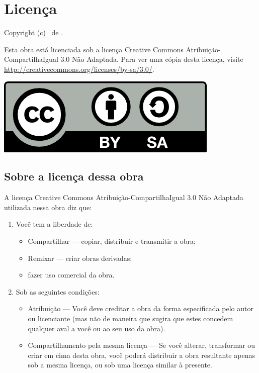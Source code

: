 \chapter{Licença}
Copyright (c) \ano \ de \autor.

Esta obra está licenciada sob a licença Creative Commons
Atribuição-CompartilhaIgual 3.0 Não Adaptada. Para ver uma cópia desta licença,
visite \url{http://creativecommons.org/licenses/by-sa/3.0/}.

\begin{center}
  \includegraphics{figuras/cc-by-sa.png}
\end{center}

\section{Sobre a licença dessa obra}
A licença Creative Commons Atribuição-CompartilhaIgual 3.0 Não Adaptada
utilizada nessa obra diz que:
\begin{enumerate}
  \item Você tem a liberdade de:
    \begin{itemize}
      \item Compartilhar — copiar, distribuir e transmitir a obra;
      \item Remixar — criar obras derivadas;
      \item fazer uso comercial da obra.
    \end{itemize}
  \item Sob as seguintes condições:
    \begin{itemize}
      \item Atribuição — Você deve creditar a obra da forma especificada pelo
        autor ou licenciante (mas não de maneira que sugira que estes concedem
        qualquer aval a você ou ao seu uso da obra).
      \item Compartilhamento pela mesma licença — Se você alterar, transformar
        ou criar em cima desta obra, você poderá distribuir a obra resultante
        apenas sob a mesma licença, ou sob uma licença similar à presente.
    \end{itemize}
\end{enumerate}

